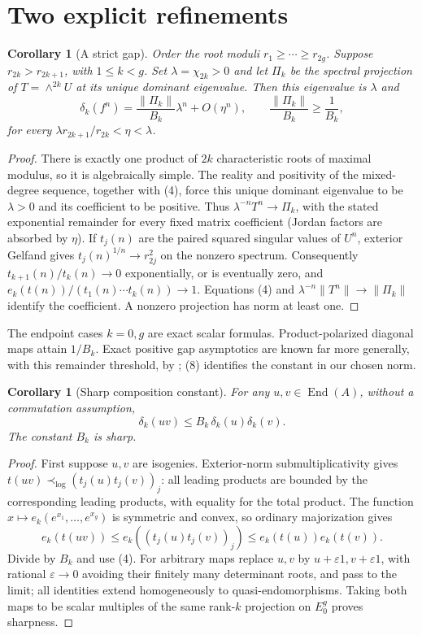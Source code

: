 \documentclass[11pt]{article}
\newtheorem{corollary}[theorem]{Corollary}
\theoremstyle{remark}\newtheorem{remark}[theorem]{Remark}
\newcommand{\End}{\operatorname{End}}
\begin{document}
\section{Two explicit refinements}
\begin{corollary}[A strict gap]\label{gap}
Order the root moduli $r_1\ge\cdots\ge r_{2g}$. Suppose
$r_{2k}>r_{2k+1}$, with $1\le k<g$. Set $\lambda=\chi_{2k}>0$ and let
$\Pi_k$ be the spectral projection of $T=\wedge^{2k}U$ at its unique
dominant eigenvalue. Then this eigenvalue is $\lambda$ and
\[
 \delta_k(f^n)=\frac{\|\Pi_k\|}{B_k}\lambda^n+O(\eta^n),
 \qquad \frac{\|\Pi_k\|}{B_k}\ge\frac1{B_k},
 \tag{8}
\]
for every $\lambda r_{2k+1}/r_{2k}<\eta<\lambda$.
\end{corollary}
\begin{proof}
There is exactly one product of $2k$ characteristic roots of maximal
modulus, so it is algebraically simple. The reality and positivity of
the mixed-degree sequence, together with (4), force this unique
dominant eigenvalue to be $\lambda>0$ and its coefficient to be positive.
Thus $\lambda^{-n}T^n\to\Pi_k$, with the stated exponential remainder
for every fixed matrix coefficient (Jordan factors are absorbed by $\eta$).
If $t_j(n)$ are the paired squared singular values of $U^n$, exterior
Gelfand gives $t_j(n)^{1/n}\to r_{2j}^2$ on the nonzero spectrum.
Consequently $t_{k+1}(n)/t_k(n)\to0$ exponentially, or is eventually zero,
and $e_k(t(n))/(t_1(n)\cdots t_k(n))\to1$.
Equations (4) and $\lambda^{-n}\|T^n\|\to\|\Pi_k\|$ identify the
coefficient. A nonzero projection has norm at least one.
\end{proof}
The endpoint cases $k=0,g$ are exact scalar formulas. Product-polarized
diagonal maps attain $1/B_k$. Exact positive gap asymptotics are known
far more generally, with this remainder threshold, by
\cite[Theorem 1.5]{HuRecent}; (8) identifies the constant in our chosen norm.

\begin{corollary}[Sharp composition constant]\label{composition}
For any $u,v\in\End(A)$, without a commutation assumption,
\[
 \delta_k(uv)\le B_k\,\delta_k(u)\delta_k(v).
 \tag{9}
\]
The constant $B_k$ is sharp.
\end{corollary}
\begin{proof}
First suppose $u,v$ are isogenies. Exterior-norm submultiplicativity
gives $t(uv)\prec_{\log}(t_j(u)t_j(v))_j$: all leading products are
bounded by the corresponding leading products, with equality for the
total product. The function $x\mapsto e_k(e^{x_1},\ldots,e^{x_g})$ is
symmetric and convex, so ordinary majorization gives
\[
 e_k(t(uv))\le e_k((t_j(u)t_j(v))_j)
 \le e_k(t(u))e_k(t(v)).
\]
Divide by $B_k$ and use (4). For arbitrary maps replace $u,v$ by
$u+\varepsilon1,v+\varepsilon1$, with rational $\varepsilon\to0$
avoiding their finitely many determinant roots, and pass to the limit;
all identities extend homogeneously to quasi-endomorphisms.
Taking both maps to be scalar multiples of the same rank-$k$ projection
on $E_0^g$ proves sharpness.
\end{proof}
\end{document}
